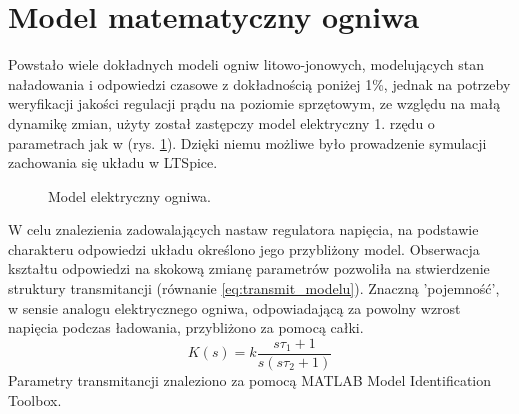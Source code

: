 \documentclass[polish,engineer]{polsl-msth}
\begin{document}
\section{Model matematyczny ogniwa}
Powstało wiele dokładnych modeli\cite{1634598_BATT_MODELS} ogniw litowo-jonowych, modelujących stan naładowania i odpowiedzi czasowe z dokładnością poniżej 1\%, jednak na potrzeby weryfikacji jakości regulacji prądu na poziomie sprzętowym, ze względu na małą dynamikę zmian, użyty został zastępczy model elektryczny 1. rzędu o parametrach jak w \cite{8759769_cellmodel1storder} (rys. \ref{img:thevenin_model}). Dzięki niemu możliwe było prowadzenie symulacji zachowania się układu w LTSpice.
\begin{figure}[hbtp]
    \centering
     \caption{Model elektryczny ogniwa.\label{img:thevenin_model}}
\end{figure}

W celu znalezienia zadowalających nastaw regulatora napięcia, na podstawie charakteru odpowiedzi układu określono jego przybliżony model. Obserwacja kształtu odpowiedzi na skokową zmianę parametrów pozwoliła na stwierdzenie struktury transmitancji (równanie \ref{eq:transmit_modelu}). Znaczną 'pojemność', w sensie analogu elektrycznego ogniwa, odpowiadającą za powolny wzrost napięcia podczas ładowania, przybliżono za pomocą całki.
\begin{equation}
    K(s) = k\frac{s\tau_1 + 1}{s(s\tau_2 + 1)}
    \label{eq:transmit_modelu}
\end{equation}
Parametry transmitancji znaleziono za pomocą MATLAB Model Identification Toolbox.

\end{document}
